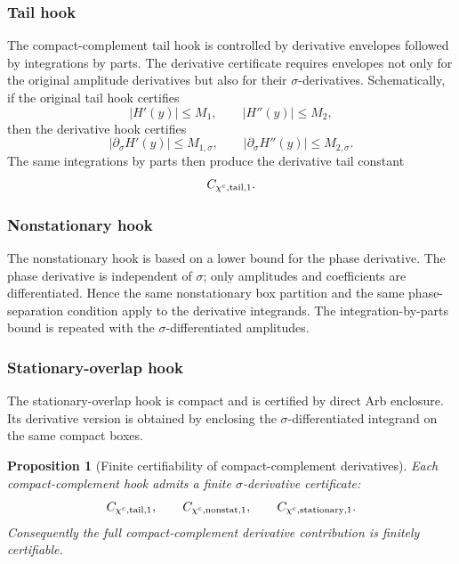 \documentclass[11pt]{article}
\newtheorem{proposition}[theorem]{Proposition}
\begin{document}
\subsubsection*{Tail hook}

The compact-complement tail hook is controlled by derivative envelopes followed
by integrations by parts.  The derivative certificate requires envelopes not
only for the original amplitude derivatives but also for their
\(\sigma\)-derivatives.  Schematically, if the original tail hook certifies
\[
        |H'(y)|\le M_1,
        \qquad
        |H''(y)|\le M_2,
\]
then the derivative hook certifies
\[
        |\partial_\sigma H'(y)|\le M_{1,\sigma},
        \qquad
        |\partial_\sigma H''(y)|\le M_{2,\sigma}.
\]
The same integrations by parts then produce the derivative tail constant
\[
        C_{\chi^c,{\rm tail},1}.
\]

\subsubsection*{Nonstationary hook}

The nonstationary hook is based on a lower bound for the phase derivative.  The
phase derivative is independent of \(\sigma\); only amplitudes and coefficients
are differentiated.  Hence the same nonstationary box partition and the same
phase-separation condition apply to the derivative integrands.  The
integration-by-parts bound is repeated with the \(\sigma\)-differentiated
amplitudes.

\subsubsection*{Stationary-overlap hook}

The stationary-overlap hook is compact and is certified by direct Arb
enclosure.  Its derivative version is obtained by enclosing the
\(\sigma\)-differentiated integrand on the same compact boxes.

\begin{proposition}[Finite certifiability of compact-complement derivatives]
\label{prop:chic-derivative-certifiable}
Each compact-complement hook admits a finite \(\sigma\)-derivative certificate:
\[
        C_{\chi^c,{\rm tail},1},
        \qquad
        C_{\chi^c,{\rm nonstat},1},
        \qquad
        C_{\chi^c,{\rm stationary},1}.
\]
Consequently the full compact-complement derivative contribution is finitely
certifiable.
\end{proposition}
\end{document}
